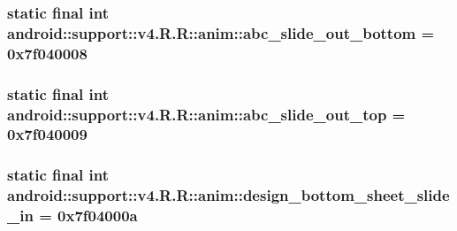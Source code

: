 \hypertarget{classandroid_1_1support_1_1v4_1_1_r_1_1anim_dc9120f5905d0c662967fad6b35476c9}{
\subsubsection[{abc\_\-slide\_\-out\_\-bottom}]{\setlength{\rightskip}{0pt plus 5cm}static final int android::support::v4.R.R::anim::abc\_\-slide\_\-out\_\-bottom = 0x7f040008}}
\label{classandroid_1_1support_1_1v4_1_1_r_1_1anim_dc9120f5905d0c662967fad6b35476c9}


\hypertarget{classandroid_1_1support_1_1v4_1_1_r_1_1anim_774f78633c593374547ebfe41eea8d80}{
\subsubsection[{abc\_\-slide\_\-out\_\-top}]{\setlength{\rightskip}{0pt plus 5cm}static final int android::support::v4.R.R::anim::abc\_\-slide\_\-out\_\-top = 0x7f040009}}
\label{classandroid_1_1support_1_1v4_1_1_r_1_1anim_774f78633c593374547ebfe41eea8d80}


\hypertarget{classandroid_1_1support_1_1v4_1_1_r_1_1anim_25c6349bc535153c4d6121447b0e15a4}{
\subsubsection[{design\_\-bottom\_\-sheet\_\-slide\_\-in}]{\setlength{\rightskip}{0pt plus 5cm}static final int android::support::v4.R.R::anim::design\_\-bottom\_\-sheet\_\-slide\_\-in = 0x7f04000a}}
\label{classandroid_1_1support_1_1v4_1_1_r_1_1anim_25c6349bc535153c4d6121447b0e15a4}


